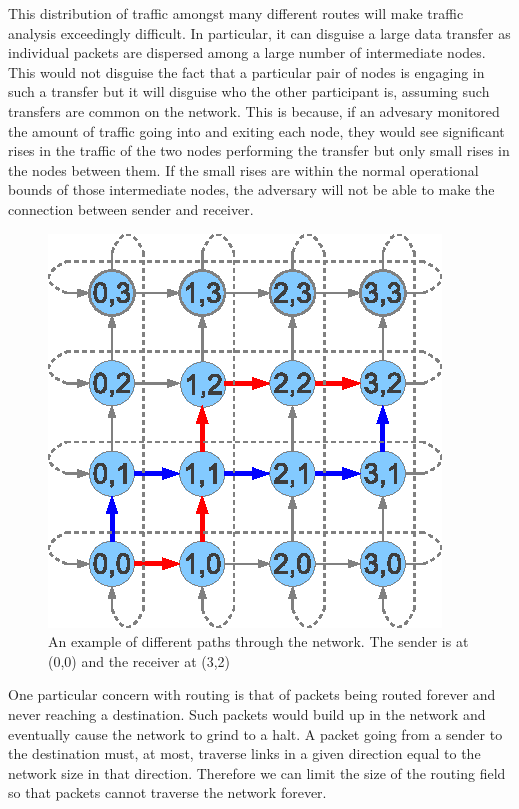 \documentclass[ %
                    author={Luke Murray},
                supervisor={Dr. Simon Hollis},
                     title={Shadow Peer-to-Peer Networks},
                  subtitle={},
                    degree={MEng},
                      year={2013} ]{thesis}
\begin{document}
This distribution of traffic amongst many different routes will make traffic analysis exceedingly difficult. In particular, it can disguise a large data transfer as individual packets are dispersed among a large number of intermediate nodes. This would not disguise the fact that a particular pair of nodes is engaging in such a transfer but it will disguise who the other participant is, assuming such transfers are common on the network. This is because, if an advesary monitored the amount of traffic going into and exiting each node, they would see significant rises in the traffic of the two nodes performing the transfer but only small rises in the nodes between them. If the small rises are within the normal operational bounds of those intermediate nodes, the adversary will not be able to make the connection between sender and receiver.

\begin{figure}[h]
\centering
\includegraphics{diagrams/network_path.eps}
\caption{An example of different paths through the network. The sender is at (0,0) and the receiver at (3,2)}
\label{path}
\end{figure}

One particular concern with routing is that of packets being routed forever and never reaching a destination. Such packets would build up in the network and eventually cause the network to grind to a halt. A packet going from a sender to the destination must, at most, traverse links in a given direction equal to the network size in that direction. Therefore we can limit the size of the routing field so that packets cannot traverse the network forever. 
\end{document}
